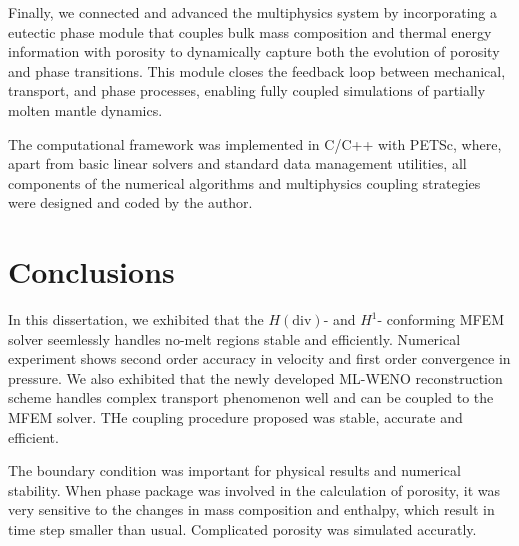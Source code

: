 Finally, we connected and advanced the multiphysics system by incorporating a eutectic phase module that
 couples bulk mass composition and thermal energy information with porosity to dynamically capture
both the evolution of porosity and phase transitions.
This module closes the feedback loop between mechanical, transport, and phase processes, 
enabling fully coupled simulations of partially molten mantle dynamics.

The computational framework was implemented in C/C++ with PETSc, where, apart from basic linear solvers and 
standard data management utilities, all components of the numerical algorithms and multiphysics coupling 
strategies were designed and coded by the author.

\section{Conclusions}
\iffalse
In this dissertation, we exhibited that the $H(\text{div})$- and $H^1$- conforming MFEM solver 
seemlessly handles no-melt regions stable and efficiently. Numerical experiment shows 
second order accuracy in velocity and first order convergence in pressure.
We also exhibited that the newly developed ML-WENO reconstruction scheme handles 
complex transport phenomenon well and can be coupled to the MFEM solver.
THe coupling procedure proposed was stable, accurate and efficient.

The boundary condition was important for physical results and numerical stability.
When phase package was involved in the calculation of porosity, it was very sensitive to
the changes in mass composition and enthalpy, which result in time step smaller than 
usual. Complicated porosity was simulated accuratly.

